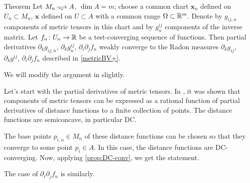 \begin{thm}{Theorem}\label{metricBV}
Let $M_n\smooths{} A$, $\dim A=m$; choose a common chart $\bm{x}_n$ defined on $U_n\subset M_n$, $\bm{x}$ defined on $U\subset A$ with a common range $\Omega\subset \mathbb{R}^m$.
Denote by $g_{ij,n}$ components of metric tensors in this chart
and by $g^{ij}_n$ components of the inverse matrix. 
Let $f_n\colon U_n\to \mathbb{R}$ be a test-converging sequence of functions.
Then partial derivatives $\partial_k g_{ij,n}$, $\partial_k g^{ij}_n$, $\partial_i\partial_jf_n$ weakly converge to the Radon measures $\partial_k g_{ij}$, $\partial_k g^{ij}$, $\partial_i\partial_jf_n$ described in \ref{metricBV+}.
\end{thm}

We will modify the argument in \cite[Section 4]{PerDC} slightly.


Let's start with the partial derivatives of metric tensors.
In \cite[Section 4.2]{PerDC}, it was shown that components of metric tensors can be expressed as a rational function of partial derivatives of distance functions to a finite collection of points.
The distance functions are semiconcave, in particular DC.

The base points $p_{i,n}\in M_n$ of these distance functions can be chosen so that they converge to some point $p_i\in A$.
In this case, the distance functions are DC-converging.
Now, applying \ref{prop:DC-conv}, we get the statement.

The case of $\partial_i\partial_jf_n$ is similarly.
\qeds






